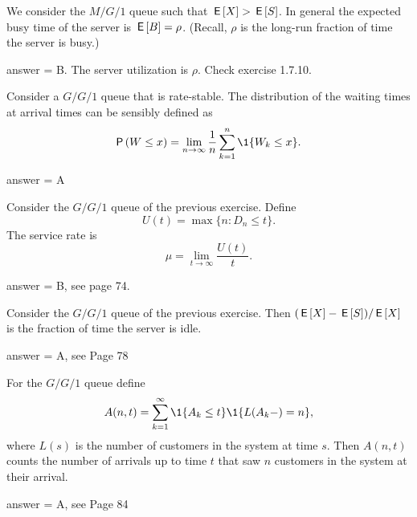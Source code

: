 \begin{exercise}[201902]
We consider the $M/G/1$ queue such that $\,\mathsf{E}\left[X\right] > \,\mathsf{E}\left[S\right]$. In general the expected busy time of the server is  $\,\mathsf{E}\left[B\right] = \rho$. (Recall, $\rho$ is the long-run fraction of time the server is busy.)
\begin{solution}
answer = B. The server utilization is $\rho$. Check exercise 1.7.10. 
\end{solution}
\end{exercise}

\begin{exercise}[201902]
Consider a $G/G/1$ queue that is rate-stable. The distribution of the waiting times at
  arrival times can be sensibly defined as
\begin{equation*}
  \P{W \leq x}  = \lim_{n\to\infty} \frac 1n\sum_{k=1}^n \1{W_k\leq x}.
\end{equation*}

\begin{solution}
answer = A
\end{solution}
\end{exercise}

\begin{exercise}[201903]
Consider the $G/G/1$ queue of the previous exercise. Define
\begin{equation*}
  U(t) = \max\{n: D_n \leq t\}.
\end{equation*}
 The service rate is 
\begin{equation*}
  \mu = \lim_{t\to\infty} \frac{U(t)}t.
\end{equation*}

\begin{solution}
answer = B, see page 74.

\end{solution}
\end{exercise}

\begin{exercise}[201903]
Consider the $G/G/1$ queue of the previous exercise. Then $(\,\mathsf{E}\left[X\right] - \,\mathsf{E}\left[S\right])/\,\mathsf{E}\left[X\right]$ is the fraction of time the server is idle.

\begin{solution}
answer = A, see Page 78
\end{solution}
\end{exercise}

\begin{exercise}[201903]
For the $G/G/1$ queue define 
\begin{equation*}
  A(n,t) = \sum_{k=1}^\infty \1{A_k \leq t}\1{L(A_k-) = n},
\end{equation*}
where $L(s)$ is the number of customers in the system at time $s$.
Then $A(n,t)$ counts the number of arrivals up to time $t$ that saw $n$ customers in the system at their arrival.

\begin{solution}
answer = A, see Page 84
\end{solution}
\end{exercise}

